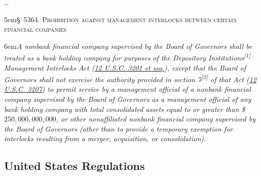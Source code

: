 \documentclass[utf8,sort&compress,numbers,square,table,hidelinks]{frontiers_suppmat} %
\begin{document}
{{		\hspace*{6em}\dots
		
		\noindent\hangindent5em\hspace*{5em}\textsc{§~5364. Prohibition against management interlocks between certain financial companies}
		
		\noindent\hangindent6em\hspace{6em}\emph{A nonbank financial company supervised by the Board of Governors shall be treated as a bank holding company for purposes of the Depository Institutions\textsuperscript{[1]} Management Interlocks Act (\uline{12 U.S.C. 3201 et seq.}), except that the Board of Governors shall not exercise the authority provided in section 7\textsuperscript{[2]} of that Act (\uline{12 U.S.C. 3207}) to permit service by a management official of a nonbank financial company supervised by the Board of Governors as a management official of any bank holding company with total consolidated assets equal to or greater than \$$250,000,000,000$, or other nonaffiliated nonbank financial company supervised by the Board of Governors (other than to provide a temporary exemption for interlocks resulting from a merger, acquisition, or consolidation).}
	}
}

\clearpage

\vspace*{6pt}
\subsection{United States Regulations}
\end{document}
